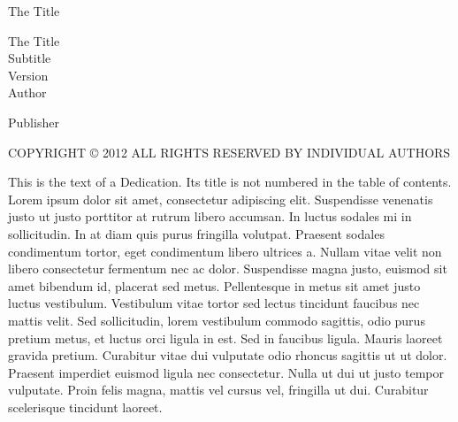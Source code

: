\documentclass[12pt]{memoir}
\begin{document}
\pagestyle{empty}
\begin{center}
\huge{The Title}
\end{center}
\clearpage


\pagestyle{empty}
\begin{center}
\huge{The Title}\\
\vskip25pt
Subtitle\\
Version\\
Author
\end{center}
\null\vfill
\begin{center}
Publisher
\end{center}
\clearpage

\null\vfill
\begin{flushleft}
COPYRIGHT © 2012
\bigskip
ALL RIGHTS RESERVED BY INDIVIDUAL AUTHORS
\end{flushleft}
\clearpage


\pagestyle{empty}
\thispagestyle{empty}%
\null\vskip1.175in%
{\centering\normalfont
This is the text of a Dedication. Its title is not numbered in the table of contents. Lorem ipsum dolor sit amet, consectetur adipiscing elit. Suspendisse venenatis justo ut justo porttitor at rutrum libero accumsan. In luctus sodales mi in sollicitudin. In at diam quis purus fringilla volutpat. Praesent sodales condimentum tortor, eget condimentum libero ultrices a. Nullam vitae velit non libero consectetur fermentum nec ac dolor. Suspendisse magna justo, euismod sit amet bibendum id, placerat sed metus. Pellentesque in metus sit amet justo luctus vestibulum. Vestibulum vitae tortor sed lectus tincidunt faucibus nec mattis velit. Sed sollicitudin, lorem vestibulum commodo sagittis, odio purus pretium metus, et luctus orci ligula in est. Sed in faucibus ligula. Mauris laoreet gravida pretium. Curabitur vitae dui vulputate odio rhoncus sagittis ut ut dolor. Praesent imperdiet euismod ligula nec consectetur. Nulla ut dui ut justo tempor vulputate. Proin felis magna, mattis vel cursus vel, fringilla ut dui. Curabitur scelerisque tincidunt laoreet.

}


\frontmatter

\tableofcontents

\mainmatter
\end{document}

